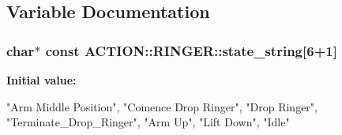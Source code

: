 \subsection{\-Variable \-Documentation}
\hypertarget{namespace_a_c_t_i_o_n_1_1_r_i_n_g_e_r_ae79f10e95a6cba81113a3d2bdb009d83}{
\subsubsection[{state\-\_\-string}]{\setlength{\rightskip}{0pt plus 5cm}char$\ast$ const {\bf \-A\-C\-T\-I\-O\-N\-::\-R\-I\-N\-G\-E\-R\-::state\-\_\-string}\mbox{[}6+1\mbox{]}}}
\label{namespace_a_c_t_i_o_n_1_1_r_i_n_g_e_r_ae79f10e95a6cba81113a3d2bdb009d83}
{\bfseries \-Initial value\-:}
\begin{DoxyCode}

        {
            "Arm Middle Position", "Comence Drop Ringer", "Drop Ringer",
            "Terminate_Drop_Ringer", "Arm Up", "Lift Down", "Idle"
        }
\end{DoxyCode}
